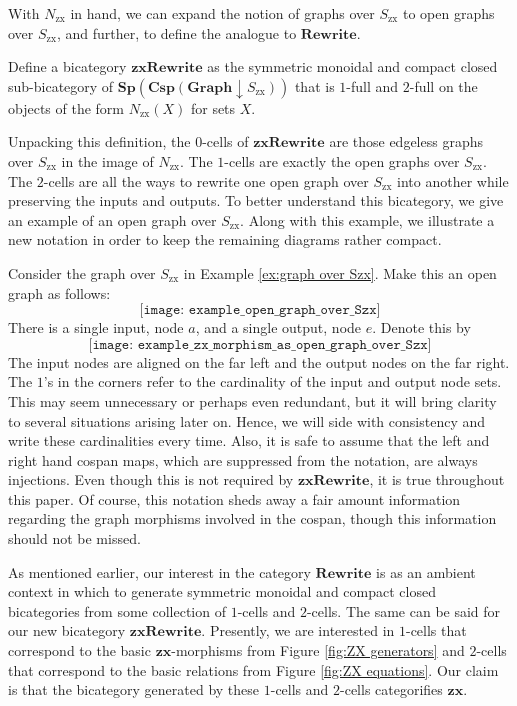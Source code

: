 \documentclass[a4paper,UKenglish]{lipics-v2016}
\begin{document}
With $N_{\text{zx}}$ in hand, we can expand the notion of graphs over $S_{\text{zx}}$ to open graphs over $S_{\text{zx}}$, and further, to define the analogue to $\mathbf{Rewrite}$. 

\begin{definition}
	Define a bicategory $\mathbf{zxRewrite}$ as the symmetric monoidal and compact closed sub-bicategory of $\mathbf{Sp}(\mathbf{Csp}(\mathbf{Graph} \downarrow S_{\text{zx}}))$ that is $1$-full and $2$-full on the objects of the form $N_{\text{zx}} (X)$ for sets $X$.  
\end{definition}

Unpacking this definition, the $0$-cells of $\mathbf{zxRewrite}$ are those edgeless graphs over $S_{\text{zx}}$ in the image of $N_{\text{zx}}$.  The $1$-cells are exactly the open graphs over $S_{\text{zx}}$. The $2$-cells are all the ways to rewrite one open graph over $S_{\text{zx}}$ into another while preserving the inputs and outputs.  To better understand this bicategory, we give an example of an open graph over $S_{\text{zx}}$. Along with this example, we illustrate a new notation in order to keep the remaining diagrams rather compact.

\begin{example}
	\label{ex:open graph over Szx}
	Consider the graph over $S_{\text{zx}}$ in Example \ref{ex:graph over Szx}.  Make this an open graph as follows:
	\[
	\texttt{[image: example\_open\_graph\_over\_Szx]}
	\]
	There is a single input, node $a$, and a single output, node $e$. Denote this by
	\[
	\texttt{[image: example\_zx\_morphism\_as\_open\_graph\_over\_Szx]}
	\]
	The input nodes are aligned on the far left and the output nodes on the far right.  The $1$'s in the corners refer to the cardinality of the input and output node sets.  This may seem unnecessary or perhaps even redundant, but it will bring clarity to several situations arising later on. Hence, we will side with consistency and write these cardinalities every time.  Also, it is safe to assume that the left and right hand cospan maps, which are suppressed from the notation, are always injections. Even though this is not required by $\mathbf{zxRewrite}$, it is true throughout this paper.  Of course, this notation sheds away a fair amount information regarding the graph morphisms involved in the cospan, though this information should not be missed.
\end{example}

As mentioned earlier, our interest in the category $\mathbf{Rewrite}$ is as an ambient context in which to generate symmetric monoidal and compact closed bicategories from some collection of $1$-cells and $2$-cells. The same can be said for our new bicategory $\mathbf{zxRewrite}$.  Presently, we are interested in $1$-cells that correspond to the basic $\mathbf{zx}$-morphisms from Figure \ref{fig:ZX generators} and $2$-cells that correspond to the basic relations from Figure \ref{fig:ZX equations}.  Our claim is that the bicategory generated by these $1$-cells and $2$-cells categorifies $\mathbf{zx}$.
\end{document}
